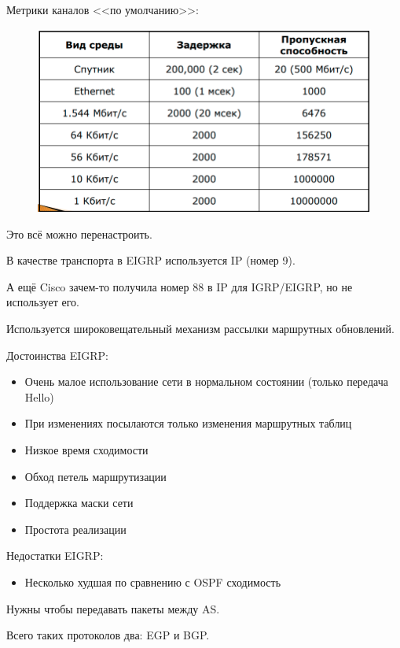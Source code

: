 Метрики каналов <<по умолчанию>>:

\begin{figure}[H]
  \centering
  \includegraphics[width=15cm]{images/04/10}
\end{figure}

Это всё можно перенастроить.

В качестве транспорта в EIGRP используется IP (номер 9).

А ещё Cisco зачем-то получила номер 88 в IP для IGRP/EIGRP, но не использует его.

Используется широковещательный механизм рассылки маршрутных обновлений.

Достоинства EIGRP:
\begin{itemize}
    \item Очень малое использование сети в нормальном состоянии (только передача Hello)
    \item При изменениях посылаются только изменения маршрутных таблиц
    \item Низкое время сходимости
    \item Обход петель маршрутизации
    \item Поддержка маски сети
    \item Простота реализации
\end{itemize}

Недостатки EIGRP:
\begin{itemize}
    \item Несколько худшая по сравнению с OSPF сходимость
\end{itemize}


Нужны чтобы передавать пакеты между AS.

Всего таких протоколов два: EGP и BGP.


